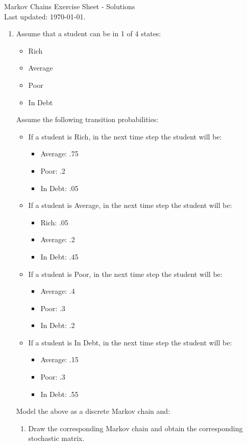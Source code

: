 \documentclass[12pt]{article}
\begin{document}
\begin{center}
\Huge{Markov Chains Exercise Sheet - Solutions}\\
\tiny{Last updated: \today.}
\end{center}

\begin{enumerate}
\item Assume that a student can be in 1 of 4 states:
\begin{itemize}
	\item Rich
	\item Average
	\item Poor
	\item In Debt
\end{itemize}
Assume the following transition probabilities:

\begin{itemize}
	\item If a student is Rich, in the next time step the student will be:
	\begin{itemize}
		\item Average: .75
		\item Poor: .2
		\item In Debt: .05
	\end{itemize}
	\item If a student is Average, in the next time step the student will be:
	\begin{itemize}
		\item Rich: .05
		\item Average: .2
		\item In Debt: .45
	\end{itemize}
	\item If a student is Poor, in the next time step the student will be:
	\begin{itemize}
		\item Average: .4
		\item Poor: .3
		\item In Debt: .2
	\end{itemize}
	\item If a student is In Debt, in the next time step the student will be:
	\begin{itemize}
		\item Average: .15
		\item Poor: .3
		\item In Debt: .55
	\end{itemize}
\end{itemize}Model the above as a discrete Markov chain and:
\begin{enumerate}
	\item Draw the corresponding Markov chain and obtain the corresponding stochastic matrix.


\end{enumerate}
\end{enumerate}
\end{document}
